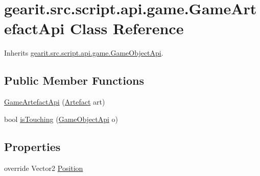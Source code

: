 \hypertarget{classgearit_1_1src_1_1script_1_1api_1_1game_1_1_game_artefact_api}{\section{gearit.\+src.\+script.\+api.\+game.\+Game\+Artefact\+Api Class Reference}
\label{classgearit_1_1src_1_1script_1_1api_1_1game_1_1_game_artefact_api}
}


Inherits \hyperlink{classgearit_1_1src_1_1script_1_1api_1_1game_1_1_game_object_api}{gearit.\+src.\+script.\+api.\+game.\+Game\+Object\+Api}.

\subsection*{Public Member Functions}
\begin{DoxyCompactItemize}
\item 
\hyperlink{classgearit_1_1src_1_1script_1_1api_1_1game_1_1_game_artefact_api_a44e02991a82ae53faad854a00d26b918}{Game\+Artefact\+Api} (\hyperlink{classgearit_1_1src_1_1map_1_1_artefact}{Artefact} art)
\item 
bool \hyperlink{classgearit_1_1src_1_1script_1_1api_1_1game_1_1_game_artefact_api_a586909e226188dfc9cd74127a0f81bd6}{is\+Touching} (\hyperlink{classgearit_1_1src_1_1script_1_1api_1_1game_1_1_game_object_api}{Game\+Object\+Api} o)
\end{DoxyCompactItemize}
\subsection*{Properties}
\begin{DoxyCompactItemize}
\item 
override Vector2 \hyperlink{classgearit_1_1src_1_1script_1_1api_1_1game_1_1_game_artefact_api_a78d9df2ac887cbd9cdddee1435348411}{Position}
\end{DoxyCompactItemize}


